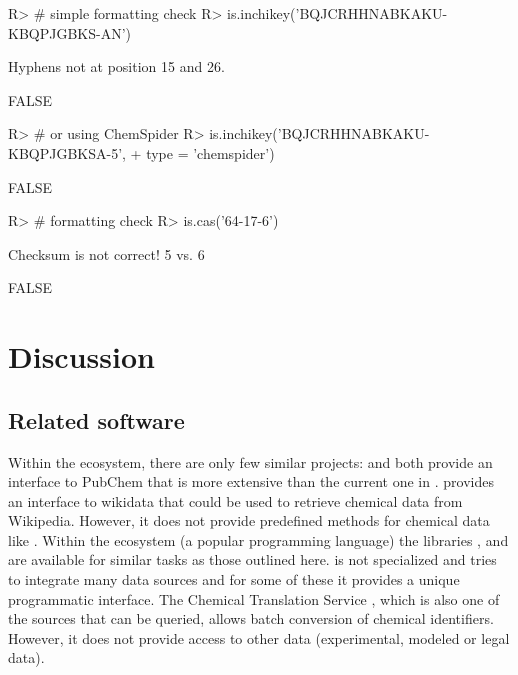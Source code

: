 \documentclass[article, shortnames]{jss}\usepackage[]{graphicx}\usepackage[]{color}
\begin{document}
\begin{CodeChunk}
\begin{CodeInput}
R> # simple formatting check
R> is.inchikey('BQJCRHHNABKAKU-KBQPJGBKS-AN')
\end{CodeInput}
\begin{CodeOutput}
Hyphens not at position 15 and 26.
\end{CodeOutput}
\begin{CodeOutput}
[1] FALSE
\end{CodeOutput}
\begin{CodeInput}
R> # or using ChemSpider
R> is.inchikey('BQJCRHHNABKAKU-KBQPJGBKSA-5', 
+        type = 'chemspider')
\end{CodeInput}
\begin{CodeOutput}
[1] FALSE
\end{CodeOutput}
\begin{CodeInput}
R> # formatting check
R> is.cas('64-17-6')
\end{CodeInput}
\begin{CodeOutput}
Checksum is not correct! 5 vs. 6
\end{CodeOutput}
\begin{CodeOutput}
[1] FALSE
\end{CodeOutput}
\end{CodeChunk}


\section[Discussion]{Discussion}
\subsection[Related software]{Related software}
Within the  ecosystem, there are only few similar projects:
 \citep{rpubchem_2014} and  \citep{chemminer_2008} both provide an interface to PubChem that is more extensive than the current one in .
 \citep{wikidatar_2016} provides an interface to wikidata that could be used to retrieve chemical data from Wikipedia.
However, it does not provide predefined methods for chemical data like .
Within the  ecosystem (a popular programming language) the libraries  \citep{pubchempy},  \citep{chemspipy} and  \citep{cirpy} are available for similar tasks as those outlined here.
 is not specialized and tries to integrate many data sources and for some of these it provides a unique programmatic interface.
The Chemical Translation Service \citep{Wohlgemuth_Haldiya_Willighagen_Kind_Fiehn_2010}, which is also one of the sources that can be queried,  allows batch conversion of chemical identifiers.
However, it does not provide access to other data (experimental, modeled or legal data).
\end{document}
